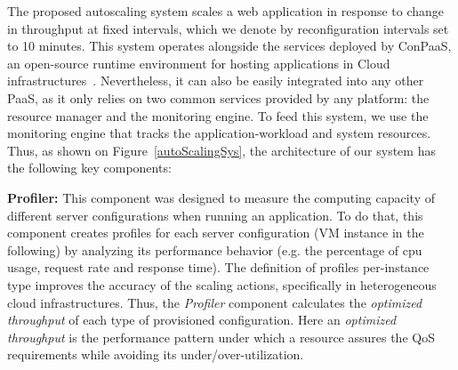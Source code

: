 
The proposed autoscaling system scales a web application in response to change in throughput at fixed intervals, which we denote by reconfiguration intervals set to 10 minutes.  This system operates alongside the services deployed by ConPaaS, an open-source runtime environment for hosting applications in Cloud infrastructures~\cite{conpaasIC}. Nevertheless, it can also be easily integrated into any other PaaS, as it only relies on two common services provided by any platform: the resource manager and the monitoring engine. To feed this system, we use the monitoring engine that tracks the application-workload and system resources. Thus, as shown on Figure~\ref{autoScalingSys}, the architecture of our system has the following key components:





\textbf{Profiler: } This component was designed to measure the computing capacity of different server configurations when running an application. To do that, this component creates profiles for each server configuration (VM instance in the following) by analyzing its performance behavior (e.g. the percentage of cpu usage, request rate and response time).  The definition of profiles per-instance type improves the accuracy of the scaling actions, specifically in heterogeneous cloud infrastructures. Thus, the \emph{Profiler} component calculates the \emph{optimized throughput} of each type of provisioned configuration. Here an \emph{optimized throughput} is the performance pattern under which a resource assures the QoS requirements while avoiding its under/over-utilization.






